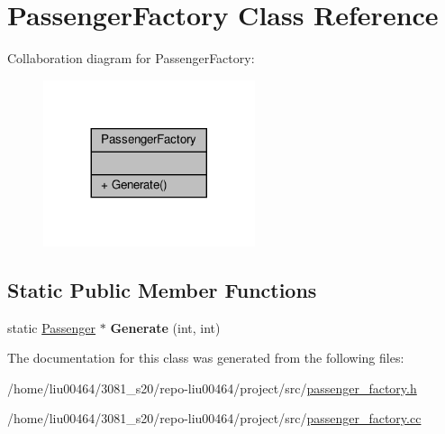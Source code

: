\hypertarget{classPassengerFactory}{}\section{Passenger\+Factory Class Reference}
\label{classPassengerFactory}


Collaboration diagram for Passenger\+Factory\+:\nopagebreak
\begin{figure}[H]
\begin{center}
\leavevmode
\includegraphics[width=176pt]{classPassengerFactory__coll__graph}
\end{center}
\end{figure}
\subsection*{Static Public Member Functions}
\begin{DoxyCompactItemize}
\item 
\mbox{\label{classPassengerFactory_a2952ba78ceb285f445bc768d287230d2}} 
static \hyperlink{classPassenger}{Passenger} $\ast$ {\bfseries Generate} (int, int)
\end{DoxyCompactItemize}


The documentation for this class was generated from the following files\+:\begin{DoxyCompactItemize}
\item 
/home/liu00464/3081\+\_\+s20/repo-\/liu00464/project/src/\hyperlink{passenger__factory_8h}{passenger\+\_\+factory.\+h}\item 
/home/liu00464/3081\+\_\+s20/repo-\/liu00464/project/src/\hyperlink{passenger__factory_8cc}{passenger\+\_\+factory.\+cc}\end{DoxyCompactItemize}
